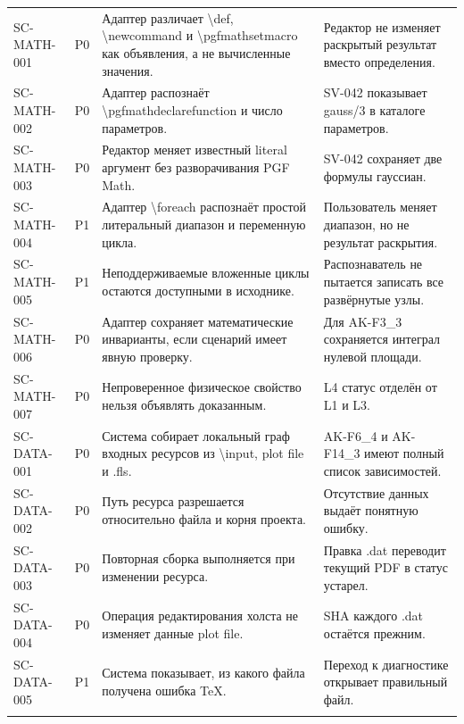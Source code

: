 \documentclass[11pt,a4paper,oneside]{scrreprt}
\begin{document}
\begin{longtable}{@{}>{\raggedright\arraybackslash}p{2.35cm}>{\raggedright\arraybackslash}p{0.75cm}>{\raggedright\arraybackslash}p{6.35cm}>{\raggedright\arraybackslash}p{5.2cm}@{}}
\footnotesize SC-MATH-001 & P0 & Адаптер различает \textbackslash{}def, \textbackslash{}newcommand и \textbackslash{}pgfmathsetmacro как объявления, а не вычисленные значения. & Редактор не изменяет раскрытый результат вместо определения. \\ \addlinespace[2pt]
\footnotesize SC-MATH-002 & P0 & Адаптер распознаёт \textbackslash{}pgfmathdeclarefunction и число параметров. & SV-042 показывает gauss/3 в каталоге параметров. \\ \addlinespace[2pt]
\footnotesize SC-MATH-003 & P0 & Редактор меняет известный literal аргумент без разворачивания PGF Math. & SV-042 сохраняет две формулы гауссиан. \\ \addlinespace[2pt]
\footnotesize SC-MATH-004 & P1 & Адаптер \textbackslash{}foreach распознаёт простой литеральный диапазон и переменную цикла. & Пользователь меняет диапазон, но не результат раскрытия. \\ \addlinespace[2pt]
\footnotesize SC-MATH-005 & P1 & Неподдерживаемые вложенные циклы остаются доступными в исходнике. & Распознаватель не пытается записать все развёрнутые узлы. \\ \addlinespace[2pt]
\footnotesize SC-MATH-006 & P0 & Адаптер сохраняет математические инварианты, если сценарий имеет явную проверку. & Для AK-F3\_3 сохраняется интеграл нулевой площади. \\ \addlinespace[2pt]
\footnotesize SC-MATH-007 & P0 & Непроверенное физическое свойство нельзя объявлять доказанным. & L4 статус отделён от L1 и L3. \\ \addlinespace[2pt]
\footnotesize SC-DATA-001 & P0 & Система собирает локальный граф входных ресурсов из \textbackslash{}input, plot file и .fls. & AK-F6\_4 и AK-F14\_3 имеют полный список зависимостей. \\ \addlinespace[2pt]
\footnotesize SC-DATA-002 & P0 & Путь ресурса разрешается относительно файла и корня проекта. & Отсутствие данных выдаёт понятную ошибку. \\ \addlinespace[2pt]
\footnotesize SC-DATA-003 & P0 & Повторная сборка выполняется при изменении ресурса. & Правка .dat переводит текущий PDF в статус устарел. \\ \addlinespace[2pt]
\footnotesize SC-DATA-004 & P0 & Операция редактирования холста не изменяет данные plot file. & SHA каждого .dat остаётся прежним. \\ \addlinespace[2pt]
\footnotesize SC-DATA-005 & P1 & Система показывает, из какого файла получена ошибка TeX. & Переход к диагностике открывает правильный файл. \\ \addlinespace[2pt]

\end{longtable}
\end{document}
